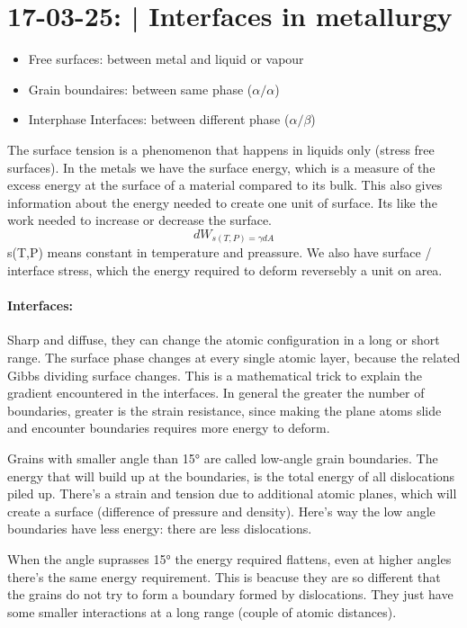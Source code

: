 \section{17-03-25: | Interfaces in metallurgy}

\begin{itemize}
    \item Free surfaces: between metal and liquid or vapour
    \item Grain boundaires: between same phase ($\alpha/\alpha$)
    \item Interphase Interfaces: between different phase ($\alpha/\beta$)
\end{itemize}

The surface tension is a phenomenon that happens in liquids only (stress free surfaces). In the metals we have the surface energy, which is a measure of the excess energy at the surface of a material compared to its bulk. This also gives information about the energy needed to create one unit of surface. Its like the work needed to increase or decrease the surface.
\begin{equation}
    dW_{s(T,P) = \gamma dA}
\end{equation}
s(T,P) means constant in temperature and preassure. We also have surface / interface stress, which the energy required to deform reversebly a unit on area.

\paragraph{Interfaces:} Sharp and diffuse, they can change the atomic configuration in a long or short range. The surface phase changes at every single atomic layer, because the related Gibbs dividing surface changes. This is a mathematical trick to explain the gradient encountered in the interfaces. In general the greater the number of boundaries, greater is the strain resistance, since making the plane atoms slide and encounter boundaries requires more energy to deform.

Grains with smaller angle than 15° are called low-angle grain boundaries. The energy that will build up at the boundaries, is the total energy of all dislocations piled up. There's a strain and tension due to additional atomic planes, which will create a surface (difference of pressure and density). Here's way the low angle boundaries have less energy: there are less dislocations.

When the angle suprasses 15° the energy required flattens, even at higher angles there's the same energy requirement. This is beacuse they are so different that the grains do not try to form a boundary formed by dislocations. They just have some smaller interactions at a long range (couple of atomic distances).

